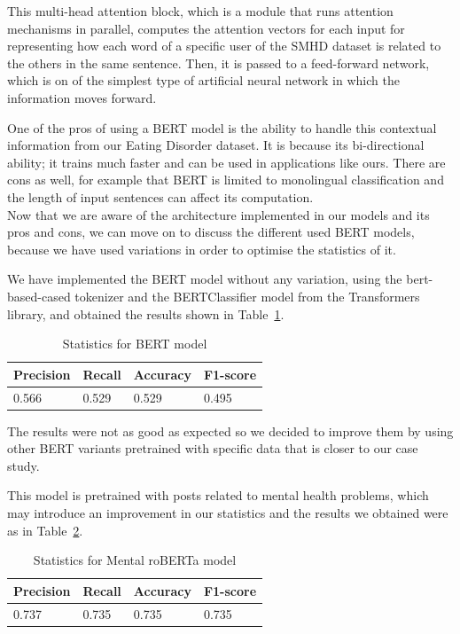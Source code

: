 This multi-head attention block, which is a module that runs attention mechanisms in parallel, computes the attention vectors for each input for representing how each word of a specific user of the SMHD dataset is related to the others in the same sentence. Then, it is passed to a feed-forward network, which is on of the simplest type of artificial neural network in which the information moves forward.

One of the pros of using a BERT model is the ability to handle this contextual information from our Eating Disorder dataset. It is because its bi-directional ability; it trains much faster and can be used in applications like ours. There are cons as well, for example that BERT is limited to monolingual classification and the length of input sentences can affect its computation. \\

Now that we are aware of the architecture implemented in our models and its pros and cons, we can move on to discuss the different used BERT models, because we have used variations in order to optimise the statistics of it.


We have implemented the BERT model without any variation, using the bert-based-cased tokenizer and the BERTClassifier model from the Transformers library, and obtained the results shown in Table~\ref{tab:BERTstatistics}.

\begin{table}[!htp]
\centering
\begin{tabular}{|l|l|l|l|}
\hline
Precision & Recall & Accuracy & F1-score  \\ \hline
0.566      & 0.529  &  0.529  & 0.495 \\ \hline
\end{tabular}
\caption{Statistics for BERT model}
\label{tab:BERTstatistics}
\end{table}
The results were not as good as expected so we decided to improve them by using other BERT variants pretrained with specific data that is closer to our case study.

This model is pretrained with posts related to mental health problems, which may introduce an improvement in our statistics and the results we obtained were as in Table~\ref{tab:MentalroBERTastatistics}.
\begin{table}[!htp]
\centering
\begin{tabular}{|l|l|l|l|}
\hline
Precision & Recall   & Accuracy & F1-score\\ \hline
0.737      & 0.735   &  0.735   &  0.735      \\ \hline
\end{tabular}
\caption{Statistics for Mental roBERTa model}
\label{tab:MentalroBERTastatistics}
\end{table}


